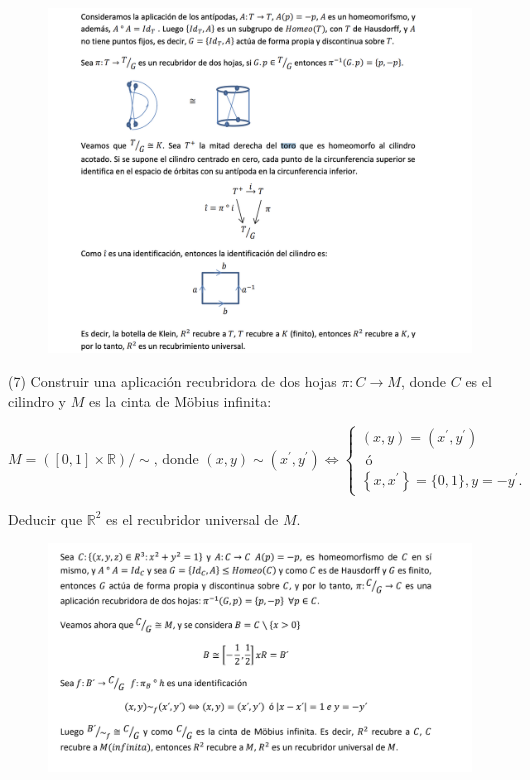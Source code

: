 \documentclass[
  a4paper,
  spanish,
  12pt,
]{scrartcl}
\begin{document}
\begin{figure}[h]
    \centering
    \includegraphics[width=\textwidth]{ej6.png}
    \label{fig:etiqueta}
\end{figure}

\newpage

\begin{ejer}
(7) Construir una aplicación recubridora de dos hojas $\pi: C \rightarrow M$, donde $C$ es el cilindro y $M$ es la cinta de Möbius infinita:

$$
M=([0,1] \times \mathbb{R}) / \sim \text {, donde }(x, y) \sim\left(x^{\prime}, y^{\prime}\right) \Leftrightarrow\left\{\begin{array}{l}
(x, y)=\left(x^{\prime}, y^{\prime}\right) \\
\text { ó } \\
\left\{x, x^{\prime}\right\}=\{0,1\}, y=-y^{\prime} .
\end{array}\right.
$$

Deducir que $\mathbb{R}^{2}$ es el recubridor universal de $M$.\\

\end{ejer}

\begin{figure}[h]
    \centering
    \includegraphics[width=\textwidth]{ej7.png}
\end{figure}
\end{document}
